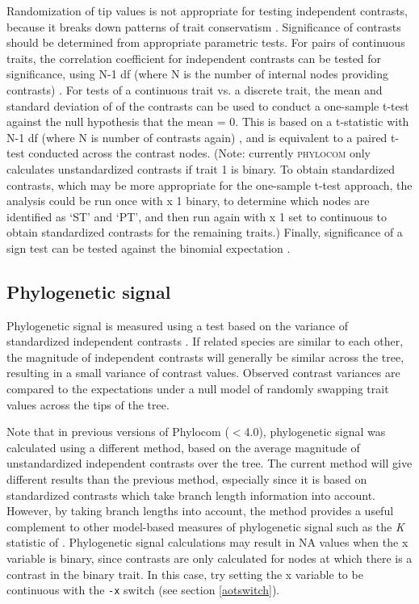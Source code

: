 \documentclass[12pt,letterpaper]{article}
\begin{document}
Randomization of tip values is not appropriate for testing independent
contrasts, because it breaks down patterns of trait conservatism
\citep[see][]{lapointe2001gen}. Significance of contrasts should be
determined from appropriate parametric tests. For pairs of continuous
traits, the correlation coefficient for independent contrasts can be
tested for significance, using N-1 df (where N is the number of
internal nodes providing contrasts) \citep[][Table
  R]{rohlf1995sta}. For tests of a continuous trait vs. a discrete
trait, the mean and standard deviation of of the contrasts can be used
to conduct a one-sample t-test against the null hypothesis that the
mean = 0. This is based on a t-statistic with N-1 df (where N is
number of contrasts again) \citep[see][Table B]{rohlf1995sta}, and is
equivalent to a paired t-test conducted across the contrast
nodes. (Note: currently {\scshape phylocom} only calculates
unstandardized contrasts if trait 1 is binary. To obtain standardized
contrasts, which may be more appropriate for the one-sample t-test
approach, the analysis could be run once with x 1 binary, to determine
which nodes are identified as `ST' and `PT', and then run again with x
1 set to continuous to obtain standardized contrasts for the remaining
traits.) Finally, significance of a sign test can be tested against
the binomial expectation \citep[][Table Q]{rohlf1995sta}.

\subsection{Phylogenetic signal}

Phylogenetic signal is measured using a test based on the variance of
standardized independent contrasts \citep{blomberg2002tem, blomberg2003tes}.
If related species are similar to each other, the magnitude of independent
contrasts will generally be similar across the tree, resulting in a
small variance of contrast values. Observed contrast variances are
compared to the expectations under a null model of randomly swapping
trait values across the tips of the tree.

Note that in previous versions of Phylocom ($<$4.0), phylogenetic
signal was calculated using a different method, based on the average
magnitude of unstandardized independent contrasts over the tree. The
current method will give different results than the previous method,
especially since it is based on standardized contrasts which take
branch length information into account. However, by taking branch lengths
into account, the method provides a useful complement to other model-based measures of
phylogenetic signal such as the \textit{K} statistic of \citet{blomberg2002tem}. Phylogenetic signal
calculations may result in NA values when the x variable is binary,
since contrasts are only calculated for nodes at which there is a
contrast in the binary trait. In this case, try setting the x variable
to be continuous with the \texttt{-x} switch (see section
\ref{aotswitch}).
\end{document}
